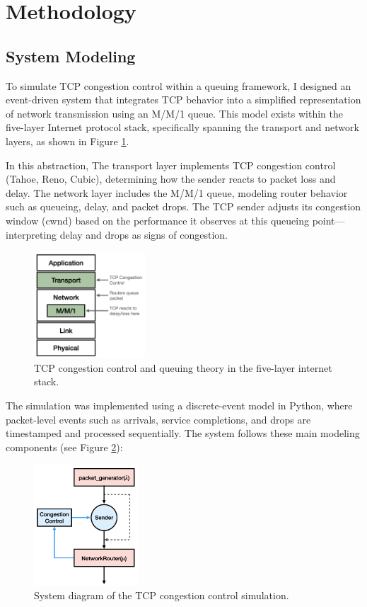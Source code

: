 \documentclass[conference]{IEEEtran}
\begin{document}
\section{Methodology}
\subsection{System Modeling}
To simulate TCP congestion control within a queuing framework, I designed an event-driven system that integrates TCP behavior into a simplified representation of network transmission using an M/M/1 queue. 
This model exists within the five-layer Internet protocol stack, specifically spanning the transport and network layers, as shown in Figure \ref{fig:tcp_stack}.

In this abstraction, The transport layer implements TCP congestion control (Tahoe, Reno, Cubic), determining how the sender reacts to packet loss and delay.
The network layer includes the M/M/1 queue, modeling router behavior such as queueing, delay, and packet drops.
The TCP sender adjusts its congestion window (cwnd) based on the performance it observes at this queueing point—interpreting delay and drops as signs of congestion.

\begin{figure}[!b]
    \centering
    \includegraphics[width=0.37\textwidth]{assets/internet_stack.png}
    \caption{TCP congestion control and queuing theory in the five-layer internet stack.}
    \label{fig:tcp_stack}
\end{figure}

The simulation was implemented using a discrete-event model in Python, where packet-level events such as arrivals, service completions, and drops are timestamped and processed sequentially. 
The system follows these main modeling components (see Figure \ref{fig:system_diagram}):

\begin{figure}[!b]
    \centering
    \includegraphics[width=0.35\textwidth]{assets/system_diagram.png}
    \caption{System diagram of the TCP congestion control simulation.}
    \label{fig:system_diagram}
\end{figure}
\end{document}
